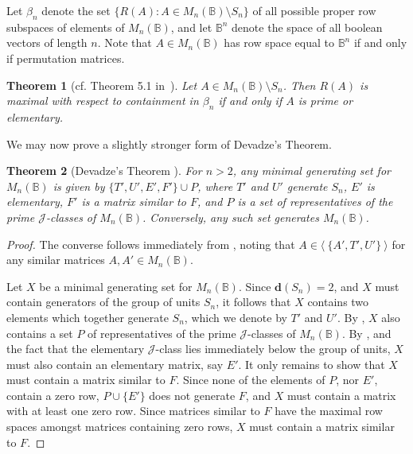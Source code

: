 \documentclass[11pt]{article}
\newtheorem{thm}{Theorem}[section]
\numberwithin{equation}{section}
\newcommand{\set}[2]{\ensuremath{\{#1 : #2 \}}}
\newcommand{\genset}[1]{\ensuremath{\langle\: #1 \:\rangle}}
\newcommand{\B}{\mathbb{B}}
\newcommand{\Bn}{M_n(\B)}
\newcommand{\J}{\mathscr{J}}
\begin{document}
Let $\beta_n$ denote the set $\set{R(A)}{A\in \Bn\setminus S_n}$ of all
possible proper row subspaces of elements of $\Bn$, and let $\B^n$ denote
the space of all boolean vectors of length $n$. Note that $A \in \Bn$ has row
space equal to $\B^n$ if and only if permutation matrices.

\begin{thm}[cf. Theorem 5.1 in~\cite{Caen1981ab}]
  Let $A \in \Bn\setminus S_n$. Then $R(A)$ is maximal with respect to
  containment in $\beta_n$ if and only if $A$ is prime or elementary.  
\end{thm}

We may now prove a slightly stronger form of Devadze's Theorem.

\begin{thm}[Devadze's Theorem \cite{Konieczny2011aa}]
  For $n > 2$, any minimal generating set for $\Bn$ is given by $\{T', U', E',
    F'\} \cup P$, where $T'$ and $U'$ generate $S_n$, $E'$ is elementary, $F'$
  is a matrix similar to $F$, and $P$ is a set of representatives of the prime
  $\J$-classes of $\Bn$. Conversely, any such set generates $\Bn$.
\end{thm}
\begin{proof}
  The converse follows immediately from , noting that $A
  \in \genset{\{A', T', U'\}}$ for any similar matrices $A, A' \in \Bn$.

  Let $X$ be a minimal generating set for $\Bn$. Since $\mathbf{d}(S_n) = 2$,
  and $X$ must contain generators of the group of units $S_n$, it follows that
  $X$ contains two elements which together generate $S_n$, which we denote by
  $T'$ and $U'$. By \cite[Lemma 4.2]{Konieczny2011aa}, $X$ also contains a set
  $P$ of representatives of the prime $\J$-classes of $\Bn$. By \cite[Lemma
  4.5]{Konieczny2011aa}, and the fact that the elementary $\J$-class lies
  immediately below the group of units, $X$ must also contain an elementary
  matrix, say $E'$. It only remains to show that $X$ must contain a matrix
  similar to $F$. Since none of the elements of $P$, nor $E'$, contain a
  zero row, $P \cup \{E'\}$ does not generate $F$, and $X$ must contain a matrix
  with at least one zero row. Since matrices similar to $F$ have the maximal row
  spaces amongst matrices containing zero rows, $X$ must contain a matrix
  similar to $F$.
\end{proof} 

\end{document}
